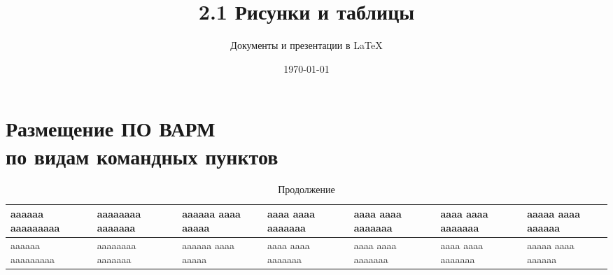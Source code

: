 \documentclass[12pt]{article}
\author{Документы и презентации в \LaTeX}
\title{2.1 Рисунки и таблицы}
\date{\today}
\begin{document}

\centering \section*  {Размещение ПО ВАРМ \\ по видам командных пунктов}
\begin{longtable}{|m{}|R{0.08\textwidth}|R{0.08\textwidth}|R{0.08\textwidth}|R{0.08\textwidth}|R{0.08\textwidth}|R{0.08\textwidth}|}
    \caption{размещение ПО}
    \hline
    aaaaaa \newline aaaaaaaaa & aaaaaaaa aaaaaaa & aaaaaa aaaa aaaaa & aaaa aaaa aaaaaaa & aaaa aaaa aaaaaaa & aaaa aaaa aaaaaaa & aaaaa aaaa aaaaaa \\
    \hline
    \endfirsthead

    \caption{Продолжение}
    \hline
    aaaaaa \newline aaaaaaaaa & aaaaaaaa aaaaaaa & aaaaaa aaaa aaaaa & aaaa aaaa aaaaaaa & aaaa aaaa aaaaaaa & aaaa aaaa aaaaaaa & aaaaa aaaa aaaaaa \\
    \hline
    \endhead


\end{longtable}
\end{document}
